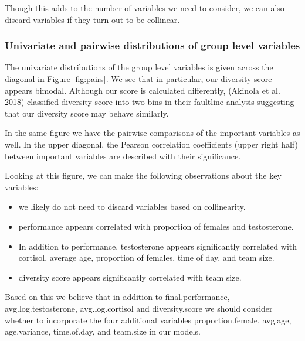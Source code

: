 \documentclass[]{article}
\providecommand{\tightlist}{%
  \setlength{\itemsep}{0pt}\setlength{\parskip}{0pt}}
\begin{document}
Though this adds to the number of variables we need to consider, we can
also discard variables if they turn out to be collinear.

\hypertarget{univariate-and-pairwise-distributions-of-group-level-variables}{%
\subsubsection{Univariate and pairwise distributions of group level
variables}\label{univariate-and-pairwise-distributions-of-group-level-variables}}

The univariate distributions of the group level variables is given
across the diagonal in Figure \ref{fig:pairs}. We see that in
particular, our diversity score appears bimodal. Although our score is
calculated differently, (Akinola et al. 2018) classified diversity score
into two bins in their faultline analysis suggesting that our diversity
score may behave similarly.

In the same figure we have the pairwise comparisons of the important
variables as well. In the upper diagonal, the Pearson correlation
coefficients (upper right half) between important variables are
described with their significance.

Looking at this figure, we can make the following observations about the
key variables:

\begin{itemize}
\tightlist
\item
  we likely do not need to discard variables based on collinearity.
\item
  performance appears correlated with proportion of females and
  testosterone.
\item
  In addition to performance, testosterone appears significantly
  correlated with cortisol, average age, proportion of females, time of
  day, and team size.
\item
  diversity score appears significantly correlated with team size.
\end{itemize}

Based on this we believe that in addition to final.performance,
avg.log.testosterone, avg.log.cortisol and diversity.score we should
consider whether to incorporate the four additional variables
proportion.female, avg.age, age.variance, time.of.day, and team.size in
our models.
\end{document}
